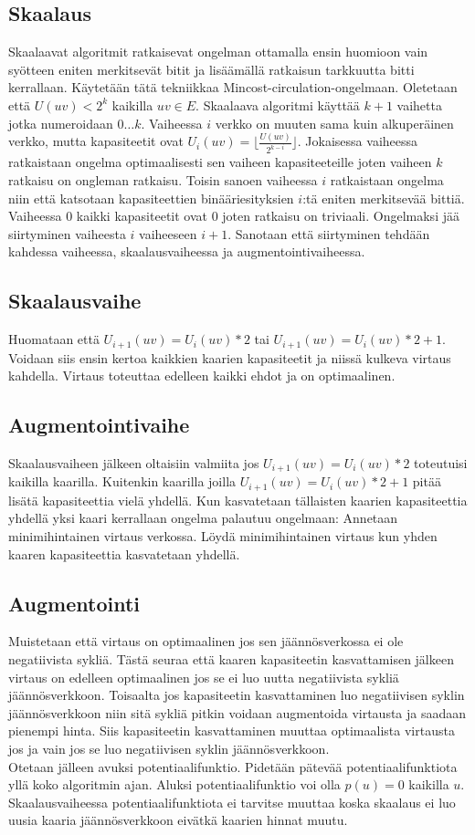 \documentclass[a4paper, 11pt]{article}
\begin{document}
\subsection*{Skaalaus}
Skaalaavat algoritmit ratkaisevat ongelman ottamalla ensin huomioon vain syötteen
eniten merkitsevät bitit ja lisäämällä ratkaisun tarkkuutta bitti kerrallaan. Käytetään
tätä tekniikkaa Mincost-circulation-ongelmaan. Oletetaan että $U(uv) < 2^k$ kaikilla $uv \in E$.
Skaalaava algoritmi käyttää $k+1$ vaihetta jotka numeroidaan $0 \ldots k$. Vaiheessa 
$i$ verkko on muuten sama kuin 
alkuperäinen verkko, mutta kapasiteetit ovat $U_i(uv) = \lfloor \frac{U(uv)}{2^{k-i}} \rfloor$.
Jokaisessa vaiheessa ratkaistaan ongelma optimaalisesti sen vaiheen kapasiteeteille joten vaiheen
$k$ ratkaisu on ongleman ratkaisu.
Toisin sanoen vaiheessa $i$ ratkaistaan ongelma niin että katsotaan kapasiteettien
binääriesityksien $i$:tä eniten merkitsevää bittiä. Vaiheessa $0$ kaikki kapasiteetit ovat $0$ joten
ratkaisu on triviaali. Ongelmaksi jää siirtyminen vaiheesta $i$ vaiheeseen $i+1$. Sanotaan
että siirtyminen tehdään kahdessa vaiheessa, skaalausvaiheessa ja augmentointivaiheessa.
\subsection*{Skaalausvaihe}
Huomataan että $U_{i+1}(uv) = U_i(uv)*2$ tai $U_{i+1}(uv) = U_i(uv)*2+1$. Voidaan siis ensin kertoa
kaikkien kaarien kapasiteetit ja niissä kulkeva virtaus kahdella. Virtaus toteuttaa edelleen
kaikki ehdot ja on optimaalinen.
\subsection*{Augmentointivaihe}
Skaalausvaiheen jälkeen oltaisiin valmiita jos $U_{i+1}(uv) = U_i(uv)*2$ toteutuisi kaikilla
kaarilla. Kuitenkin kaarilla joilla $U_{i+1}(uv) = U_i(uv)*2+1$ pitää lisätä kapasiteettia 
vielä yhdellä.
Kun kasvatetaan tällaisten kaarien kapasiteettia yhdellä yksi kaari kerrallaan 
ongelma palautuu ongelmaan:
Annetaan minimihintainen virtaus verkossa. Löydä minimihintainen virtaus kun yhden kaaren 
kapasiteettia kasvatetaan yhdellä.
\subsection*{Augmentointi}
Muistetaan että virtaus on optimaalinen jos sen jäännösverkossa ei ole negatiivista
sykliä. Tästä seuraa että kaaren kapasiteetin kasvattamisen jälkeen virtaus on edelleen optimaalinen
jos se ei luo uutta negatiivista sykliä jäännösverkkoon. Toisaalta jos kapasiteetin
kasvattaminen luo negatiivisen syklin jäännösverkkoon niin sitä sykliä pitkin voidaan
augmentoida virtausta ja saadaan pienempi hinta. Siis kapasiteetin kasvattaminen 
muuttaa optimaalista virtausta
jos ja vain jos se luo negatiivisen syklin jäännösverkkoon. \\
\noindent
Otetaan jälleen avuksi potentiaalifunktio. Pidetään pätevää potentiaalifunktiota 
yllä koko algoritmin ajan. Aluksi potentiaalifunktio voi olla $p(u) = 0$ kaikilla $u$.
Skaalausvaiheessa potentiaalifunktiota ei tarvitse muuttaa koska skaalaus ei luo
uusia kaaria jäännösverkkoon eivätkä kaarien hinnat muutu.
\end{document}
